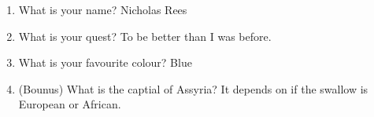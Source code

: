 \documentclass{article}
\begin{document}
\begin{enumerate}
	\item What is your name?
	\newline Nicholas Rees
	\item What is your quest?
	\newline To be better than I was before.
	\item What is your favourite colour?
	\newline Blue
	\item (Bounus) What is the captial of Assyria?
	\newline It depends on if the swallow is European or African.
\end{enumerate}
\end{document}
